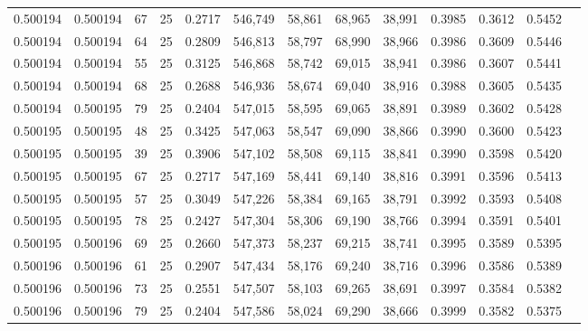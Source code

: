 \begin{tabular}{rrrrrrrrrrrrr}
0.500194 & 0.500194 &    67 &  25 &                                     0.2717 & 546,749 &  58,861 &  68,965 &  38,991 & 0.3985 & 0.3612 & 0.5452 \\
0.500194 & 0.500194 &    64 &  25 &                                     0.2809 & 546,813 &  58,797 &  68,990 &  38,966 & 0.3986 & 0.3609 & 0.5446 \\
0.500194 & 0.500194 &    55 &  25 &                                     0.3125 & 546,868 &  58,742 &  69,015 &  38,941 & 0.3986 & 0.3607 & 0.5441 \\
0.500194 & 0.500194 &    68 &  25 &                                     0.2688 & 546,936 &  58,674 &  69,040 &  38,916 & 0.3988 & 0.3605 & 0.5435 \\
0.500194 & 0.500195 &    79 &  25 &                                     0.2404 & 547,015 &  58,595 &  69,065 &  38,891 & 0.3989 & 0.3602 & 0.5428 \\
0.500195 & 0.500195 &    48 &  25 &                                     0.3425 & 547,063 &  58,547 &  69,090 &  38,866 & 0.3990 & 0.3600 & 0.5423 \\
0.500195 & 0.500195 &    39 &  25 &                                     0.3906 & 547,102 &  58,508 &  69,115 &  38,841 & 0.3990 & 0.3598 & 0.5420 \\
0.500195 & 0.500195 &    67 &  25 &                                     0.2717 & 547,169 &  58,441 &  69,140 &  38,816 & 0.3991 & 0.3596 & 0.5413 \\
0.500195 & 0.500195 &    57 &  25 &                                     0.3049 & 547,226 &  58,384 &  69,165 &  38,791 & 0.3992 & 0.3593 & 0.5408 \\
0.500195 & 0.500195 &    78 &  25 &                                     0.2427 & 547,304 &  58,306 &  69,190 &  38,766 & 0.3994 & 0.3591 & 0.5401 \\
0.500195 & 0.500196 &    69 &  25 &                                     0.2660 & 547,373 &  58,237 &  69,215 &  38,741 & 0.3995 & 0.3589 & 0.5395 \\
0.500196 & 0.500196 &    61 &  25 &                                     0.2907 & 547,434 &  58,176 &  69,240 &  38,716 & 0.3996 & 0.3586 & 0.5389 \\
0.500196 & 0.500196 &    73 &  25 &                                     0.2551 & 547,507 &  58,103 &  69,265 &  38,691 & 0.3997 & 0.3584 & 0.5382 \\
0.500196 & 0.500196 &    79 &  25 &                                     0.2404 & 547,586 &  58,024 &  69,290 &  38,666 & 0.3999 & 0.3582 & 0.5375 \\

\end{tabular}
